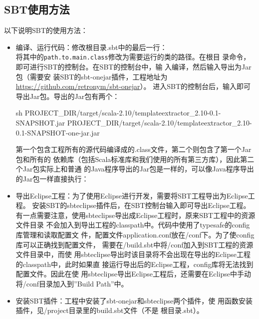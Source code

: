 \documentclass{article}
\begin{document}
\subsection{SBT使用方法}
\label{sec:sbt}
以下说明SBT的使用方法：
\begin{itemize}
\item 编译、运行代码：修改根目录.sbt中的最后一行：\\
  将其中的\texttt{path.to.main.class}修改为需要运行的类的路径。在根目
  录命令，即可进行SBT的控制台。在SBT的控制台中，输
  入编译，然后输入导出为Jar包（需要安
  装SBT的sbt-onejar插件，工程地址为\url{https://github.com/retronym/sbt-onejar}）。
  进入SBT的控制台后，输入即可导出Jar包。导出的Jar包有两个：\\  
  \begin{code}{sh}
PROJECT_DIR/target/scala-2.10/templateextractor_2.10-0.1-SNAPSHOT.jar  
PROJECT_DIR/target/scala-2.10/templateextractor_2.10-0.1-SNAPSHOT-one-jar.jar
  \end{code}
  第一个包含工程所有的源代码编译成的.class文件，第二个则包含了第一个Jar包和所有的
  依赖库（包括Scala标准库和我们使用的所有第三方库），因此第二个Jar包实际上和普通
  的Java程序导出的Jar包是一样的，可以像Java程序导出的Jar包一样直接执行：\\
\item 导出Eclipse工程：为了使用Eclipse进行开发，需要将SBT工程导出为Eclipse工程。
  安装SBT的sbteclipse插件后，在SBT控制台输入即可导出Eclipse工程。\\
  有一点需要注意，使用sbteclipse导出成Eclipse工程时，原来SBT工程中的资源文件目录
  不会加入到导出工程的classpath中。代码中使用了typesafe的config库管理和读取配置文
  件，配置文件application.conf放在\prj/conf下。为了使config库可以正确找到配置文件，
  需要在\prj/build.sbt中将\prj/conf加入到SBT工程的资源文件目录中，而使
  用sbteclipse导出时该目录将不会出现在导出的Eclipse工程的classpath中，此时如果直
  接运行导出后的Eclipse工程，config库将无法找到配置文件。因此在使
  用sbteclipse导出Eclipse工程后，还需要在Eclipse中手动将\prj/conf目录加入到''Build
  Path''中。
\item 安装SBT插件：工程中安装了sbt-onejar和sbteclipse两个插件，使
  用函数安装插件，见\prj/project目录里的build.sbt文件（不是
  根目录.sbt）。
\end{itemize}
\end{document}
